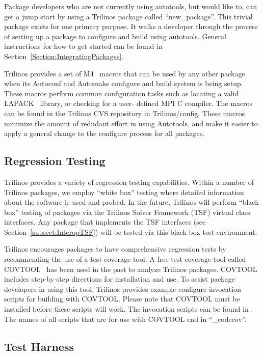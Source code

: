 \documentclass[12pt,relax]{TrilinosDevGuide}
\begin{document}
Package developers who are not currently using autotools, but would like
to, can get a jump start by using a Trilinos package called 
``new\_package''.  This trivial package exists for one primary purpose.  
It walks a developer through the process of setting up a package to 
configure and build using autotools.  General instructions for how to get 
started can be found in Section~\ref{Section:IntegratingPackages}.

Trilinos provides a set of M4~\cite{M4} macros that can be used by any other
package when its Autoconf and Automake configure and build system is being 
setup.  These macros perform common configuration tasks such as
locating a valid LAPACK~\cite{lapack} library, or checking for a user-
defined MPI C compiler.  The macros can be found in the Trilinos CVS 
repository in Trilinos/config.  These macros minimize the amount of redudant
 effort in using Autotools, and make it easier to apply a general change to 
the configure process for all packages.
\subsection{Regression Testing}
\label{subsect:RegressionTesting}
Trilinos provides a variety of regression
testing capabilities.  Within a number of Trilinos packages, we employ
``white box'' testing where detailed information about the software is
used and probed.  In the future, Trilinos will perform ``black box'' testing
of packages via the Trilinos Solver Framework (TSF) virtual class
interfaces.  Any package that implements the TSF interfaces (see
Section~\ref{subsect:InteropTSF}) will be tested via this black box
test environment.

Trilinos encourages packages to have comprehensive regression tests by 
recommending the use of a test coverage tool.  A free test coverage tool 
called COVTOOL~\cite{COVTOOL} has been used in the past to analyze Trilinos 
packages.  COVTOOL includes step-by-step directions for installation and use.
To assist package developers in using this tool, Trilinos provides example 
configure invocation scripts for building with COVTOOL.  Please note that 
COVTOOL must be installed before these scripts will work.  The invocation 
scripts can be found in .  The names of all 
scripts that are for use with COVTOOL end in ``\_codecov''.

\subsection{Test Harness}
\label{subsect:TestHarness}
\end{document}
